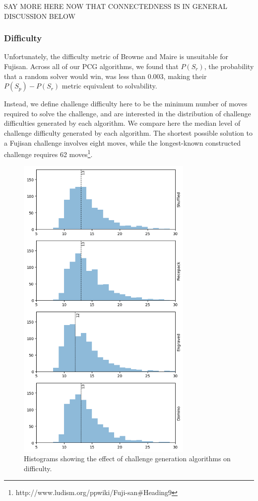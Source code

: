 \documentclass[journal]{IEEEtran}
\begin{document}
SAY MORE HERE NOW THAT CONNECTEDNESS IS IN GENERAL DISCUSSION BELOW
\subsubsection{Difficulty}

Unfortunately, the difficulty metric of Browne and Maire \cite{MCPUZZLE} is unsuitable for Fujisan. Across all of our PCG algorithms, we found that $P(S_r)$, the probability that a random solver would win, was less than 0.003, making their $P(S_p) - P(S_r)$ metric equivalent to solvability. 

Instead, we define challenge difficulty here to be the minimum number of moves required to solve the challenge, and are interested in the distribution of challenge difficulties generated by each algorithm. We compare here the median level of challenge difficulty generated by each algorithm. The shortest possible solution to a Fujisan challenge involves eight moves, while 
the longest-known constructed challenge requires 62 moves\footnote{http://www.ludism.org/ppwiki/Fuji-san\#Heading9}.

\begin{figure}[t]
\centering
\includegraphics[width=8.5cm]{standalonediff2.png}
\caption{Histograms showing the effect of challenge generation algorithms on difficulty.}
\label{fig:difficultycomp}
\end{figure}
\end{document}
